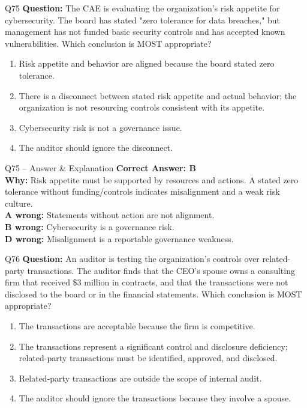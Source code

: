 \documentclass[aspectratio=169,10pt]{beamer}
\begin{document}
	\begin{frame}[t]{Q75}
		\small
		\textbf{Question:} The CAE is evaluating the organization's risk appetite for cybersecurity. The board has stated "zero tolerance for data breaches," but management has not funded basic security controls and has accepted known vulnerabilities. Which conclusion is MOST appropriate?
		\begin{enumerate}[label=\Alph*.,itemsep=1pt,topsep=2pt]
			\item Risk appetite and behavior are aligned because the board stated zero tolerance.
			\item There is a disconnect between stated risk appetite and actual behavior; the organization is not resourcing controls consistent with its appetite.
			\item Cybersecurity risk is not a governance issue.
			\item The auditor should ignore the disconnect.
		\end{enumerate}
	\end{frame}
	
	\begin{frame}[t]{Q75 -- Answer \& Explanation}
		\small
		\textbf{Correct Answer: B} \\[4pt]
		\textbf{Why:} Risk appetite must be supported by resources and actions. A stated zero tolerance without funding/controls indicates misalignment and a weak risk culture. \\[4pt]
		\textbf{A wrong:} Statements without action are not alignment. \\[2pt]
		\textbf{B wrong:} Cybersecurity is a governance risk. \\[2pt]
		\textbf{D wrong:} Misalignment is a reportable governance weakness.
	\end{frame}
	
	\begin{frame}[t]{Q76}
		\small
		\textbf{Question:} An auditor is testing the organization's controls over related-party transactions. The auditor finds that the CEO's spouse owns a consulting firm that received \$3 million in contracts, and that the transactions were not disclosed to the board or in the financial statements. Which conclusion is MOST appropriate?
		\begin{enumerate}[label=\Alph*.,itemsep=1pt,topsep=2pt]
			\item The transactions are acceptable because the firm is competitive.
			\item The transactions represent a significant control and disclosure deficiency; related-party transactions must be identified, approved, and disclosed.
			\item Related-party transactions are outside the scope of internal audit.
			\item The auditor should ignore the transactions because they involve a spouse.
		\end{enumerate}
	\end{frame}
	
\end{document}
